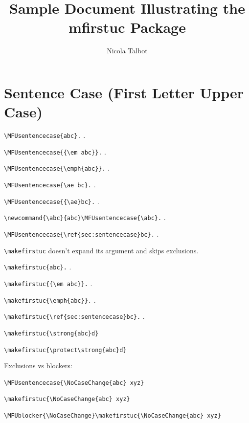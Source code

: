 \documentclass{article}
\title{Sample Document Illustrating the mfirstuc Package}
\author{Nicola Talbot}
\begin{document}
\maketitle

\tableofcontents

\section{Sentence Case (First Letter Upper Case)}
\label{sec:sentencecase}

\verb|\MFUsentencecase{abc}.|
.

\verb|\MFUsentencecase{{\em abc}}.|
.

\verb|\MFUsentencecase{\emph{abc}}.|
.

\verb|\MFUsentencecase{\ae bc}.|
.

\verb|\MFUsentencecase{{\ae}bc}.|
.

\verb|\newcommand{\abc}{abc}\MFUsentencecase{\abc}.|
\newcommand{\abc}{abc}%
\MFUsentencecase{\abc}.

\verb|\MFUsentencecase{\ref{sec:sentencecase}bc}.|
.

\verb|\makefirstuc| doesn't expand its argument and skips exclusions.

\verb|\makefirstuc{abc}.|
.

\verb|\makefirstuc{{\em abc}}.|
.

\verb|\makefirstuc{\emph{abc}}.|
.

\verb|\makefirstuc{\ref{sec:sentencecase}bc}.|
.

\newcommand{\strong}[1]{\textcolor{red}{#1}}
\verb|\makefirstuc{\strong{abc}d}|
\makefirstuc{\strong{abc}d}

\verb|\makefirstuc{\protect\strong{abc}d}|
\makefirstuc{\protect\strong{abc}d}

Exclusions vs blockers:

\verb|\MFUsentencecase{\NoCaseChange{abc} xyz}|

\verb|\makefirstuc{\NoCaseChange{abc} xyz}|

\begingroup
\verb|\MFUblocker{\NoCaseChange}\makefirstuc{\NoCaseChange{abc} xyz}|
\MFUblocker{\NoCaseChange}
\end{document}

